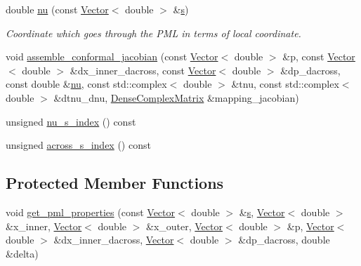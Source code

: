 \begin{DoxyCompactItemize}
double \hyperlink{classoomph_1_1Conformal2DPMLElement_ab11344b74ec10ba88440e04ab95b7426}{nu} (const \hyperlink{classoomph_1_1Vector}{Vector}$<$ double $>$ \&\hyperlink{cfortran_8h_ab7123126e4885ef647dd9c6e3807a21c}{s})
\begin{DoxyCompactList}\small\item\em Coordinate which goes through the P\+ML in terms of local coordinate. \end{DoxyCompactList}\item 
void \hyperlink{classoomph_1_1Conformal2DPMLElement_aa3eba3535690b3b8358123eb7a1160bc}{assemble\+\_\+conformal\+\_\+jacobian} (const \hyperlink{classoomph_1_1Vector}{Vector}$<$ double $>$ \&p, const \hyperlink{classoomph_1_1Vector}{Vector}$<$ double $>$ \&dx\+\_\+inner\+\_\+dacross, const \hyperlink{classoomph_1_1Vector}{Vector}$<$ double $>$ \&dp\+\_\+dacross, const double \&\hyperlink{classoomph_1_1Conformal2DPMLElement_ab11344b74ec10ba88440e04ab95b7426}{nu}, const std\+::complex$<$ double $>$ \&tnu, const std\+::complex$<$ double $>$ \&dtnu\+\_\+dnu, \hyperlink{classoomph_1_1DenseComplexMatrix}{Dense\+Complex\+Matrix} \&mapping\+\_\+jacobian)
\item 
unsigned \hyperlink{classoomph_1_1Conformal2DPMLElement_ac0fae35f94a70e615a8bbd47716a32d3}{nu\+\_\+s\+\_\+index} () const
\item 
unsigned \hyperlink{classoomph_1_1Conformal2DPMLElement_a6692b634a5f689910e4acc42b7244868}{across\+\_\+s\+\_\+index} () const
\end{DoxyCompactItemize}
\subsection*{Protected Member Functions}
\begin{DoxyCompactItemize}
\item 
void \hyperlink{classoomph_1_1Conformal2DPMLElement_a42ec3c09776f3bd2cbb6b86dd1400cd0}{get\+\_\+pml\+\_\+properties} (const \hyperlink{classoomph_1_1Vector}{Vector}$<$ double $>$ \&\hyperlink{cfortran_8h_ab7123126e4885ef647dd9c6e3807a21c}{s}, \hyperlink{classoomph_1_1Vector}{Vector}$<$ double $>$ \&x\+\_\+inner, \hyperlink{classoomph_1_1Vector}{Vector}$<$ double $>$ \&x\+\_\+outer, \hyperlink{classoomph_1_1Vector}{Vector}$<$ double $>$ \&p, \hyperlink{classoomph_1_1Vector}{Vector}$<$ double $>$ \&dx\+\_\+inner\+\_\+dacross, \hyperlink{classoomph_1_1Vector}{Vector}$<$ double $>$ \&dp\+\_\+dacross, double \&delta)
\end{DoxyCompactItemize}
